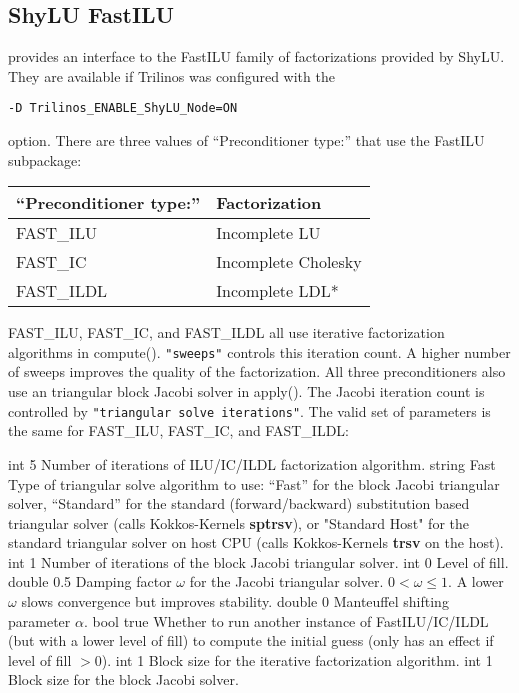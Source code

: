 \subsection{ShyLU FastILU}\label{s:FastILU}
\ifpacktwo{} provides an interface to the FastILU family of factorizations provided by ShyLU.
They are available if Trilinos was configured with the

\texttt{-D Trilinos\_ENABLE\_ShyLU\_Node=ON}

option. There are three values of ``Preconditioner type:'' that use the FastILU subpackage:

\begin{table}[h!]
\centering
\begin{tabular}{|l|l|}
\hline
``Preconditioner type:'' & Factorization   \\ \hline \hline
FAST\_ILU                & Incomplete LU       \\ \hline
FAST\_IC                 & Incomplete Cholesky \\ \hline
FAST\_ILDL               & Incomplete LDL*     \\ \hline
\end{tabular}
\end{table}

FAST\_ILU, FAST\_IC, and FAST\_ILDL all use iterative factorization algorithms in compute(). \texttt{"sweeps"} controls
this iteration count. A higher number of sweeps improves the quality of the factorization. All three
preconditioners also use an triangular block Jacobi solver in apply().
The Jacobi iteration count is controlled by \texttt{"triangular solve iterations"}.
The valid set of parameters is the same for FAST\_ILU, FAST\_IC, and FAST\_ILDL:

    {int}
    {5}
    {Number of iterations of ILU/IC/ILDL factorization algorithm.}
    {string}
    {Fast}
    {Type of triangular solve algorithm to use: ``Fast'' for the block Jacobi triangular solver, ``Standard'' for the standard (forward/backward) substitution based triangular solver (calls Kokkos-Kernels {\bf sptrsv}), or "Standard Host" for the standard triangular solver on host CPU (calls Kokkos-Kernels {\bf trsv} on the host).}
    {int}
    {1}
    {Number of iterations of the block Jacobi triangular solver.}
    {int}
    {0}
    {Level of fill.}
    {double}
    {0.5}
    {Damping factor $\omega$ for the Jacobi triangular solver. $0 < \omega \leq 1$. A lower $\omega$ slows convergence but improves stability.}
    {double}
    {0}
    {Manteuffel shifting parameter $\alpha$.}
    {bool}
    {true}
    {Whether to run another instance of FastILU/IC/ILDL (but with a lower level of fill) to compute the initial guess (only has an effect if level of fill $> 0$).} 
    {int}
    {1}
    {Block size for the iterative factorization algorithm.}
    {int}
    {1}
    {Block size for the block Jacobi solver.}

